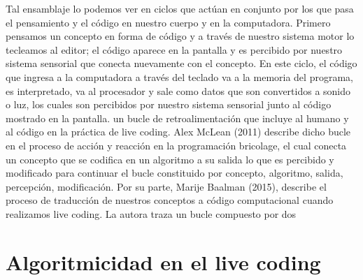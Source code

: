 Tal ensamblaje lo podemos ver en ciclos que actúan en conjunto por los que pasa el pensamiento y el código en nuestro cuerpo y en la computadora. Primero pensamos un concepto en forma de código y a través de nuestro sistema motor lo tecleamos al editor; el código aparece en la pantalla y es percibido por nuestro sistema sensorial que conecta nuevamente con el concepto. En este ciclo, el código que ingresa a la computadora a través del teclado va a la memoria del programa, es interpretado, va al procesador y sale como datos que son convertidos a sonido o luz, los cuales son percibidos por nuestro sistema sensorial junto al código mostrado en la pantalla.
un bucle de retroalimentación que incluye al humano y al código en la práctica de live coding. Alex McLean (2011) describe dicho bucle en el proceso de acción y reacción en la programación bricolage, el cual conecta un concepto que se codifica en un algoritmo a su salida lo que es percibido y modificado para continuar el bucle constituido por concepto, algoritmo, salida, percepción, modificación. Por su parte, Marije Baalman (2015), describe el proceso de traducción de nuestros conceptos a código computacional cuando realizamos live coding. La autora traza un bucle compuesto por dos


\section{Algoritmicidad en el live coding}

